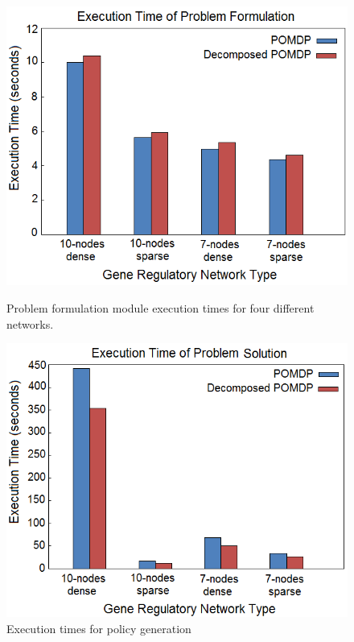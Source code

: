 \begin{figure}
\centering \includegraphics[scale=0.5]{experiments/graph9.png}
\caption{Problem formulation module execution times for four different
networks.}\label{figure:formulationgraph2}
\centering \includegraphics[scale=0.5]{experiments/graph10.png}
\caption{Execution times for policy generation}\label{figure:policygeneration2}
\end{figure}
